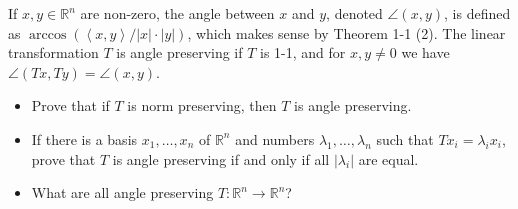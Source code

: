 \documentclass[12pt]{article}
\newenvironment{problem}[2][Problem]{\begin{trivlist}
\item[\hskip \labelsep {\bfseries #1}\hskip \labelsep {\bfseries #2.}]}{\end{trivlist}}
\begin{document}
\begin{problem}{1-8}
If $x,y \in \mathbb{R}^n$ are non-zero, the angle between $x$ and $y$, denoted $\angle\left(x,y\right)$, is defined as $\arccos \left( \left\langle x,y\right\rangle / \left|x\right| \cdot \left|y\right| \right)$, which makes sense by Theorem 1-1 (2). The linear transformation $T$ is angle preserving if $T$ is 1-1, and for $x,y \neq 0$ we have $\angle \left(Tx,Ty\right) = \angle\left(x,y\right)$.
\begin{itemize}
	\item Prove that if $T$ is norm preserving, then $T$ is angle preserving. \\
	\item If there is a basis $x_1,\ldots,x_n$ of $\mathbb{R}^n$ and numbers $\lambda_1,\ldots, \lambda_n$ such that $Tx_i = \lambda_ix_i$, prove that $T$ is angle preserving if and only if all $\left| \lambda_i \right|$ are equal. \\
	\item What are all angle preserving $T:\mathbb{R}^n \rightarrow \mathbb{R}^n$?
\end{itemize}
\end{problem}
\end{document}
